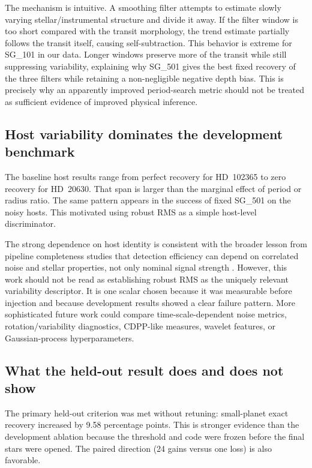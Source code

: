 \documentclass[11pt]{article}
\newcommand{\sg}[1]{\textsc{SG\_#1}}
\begin{document}
The mechanism is intuitive. A smoothing filter attempts to estimate slowly varying stellar/instrumental structure and divide it away. If the filter window is too short compared with the transit morphology, the trend estimate partially follows the transit itself, causing self-subtraction. This behavior is extreme for \sg{101} in our data. Longer windows preserve more of the transit while still suppressing variability, explaining why \sg{501} gives the best fixed recovery of the three filters while retaining a non-negligible negative depth bias. This is precisely why an apparently improved period-search metric should not be treated as sufficient evidence of improved physical inference.

\subsection{Host variability dominates the development benchmark}
The baseline host results range from perfect recovery for HD~102365 to zero recovery for HD~20630. That span is larger than the marginal effect of period or radius ratio. The same pattern appears in the success of fixed \sg{501} on the noisy hosts. This motivated using robust RMS as a simple host-level discriminator.

The strong dependence on host identity is consistent with the broader lesson from pipeline completeness studies that detection efficiency can depend on correlated noise and stellar properties, not only nominal signal strength \cite{Christiansen2016,Christiansen2020}. However, this work should not be read as establishing robust RMS as the uniquely relevant variability descriptor. It is one scalar chosen because it was measurable before injection and because development results showed a clear failure pattern. More sophisticated future work could compare time-scale-dependent noise metrics, rotation/variability diagnostics, CDPP-like measures, wavelet features, or Gaussian-process hyperparameters.

\subsection{What the held-out result does and does not show}
The primary held-out criterion was met without retuning: small-planet exact recovery increased by 9.58 percentage points. This is stronger evidence than the development ablation because the threshold and code were frozen before the final stars were opened. The paired direction (24 gains versus one loss) is also favorable.
\end{document}
